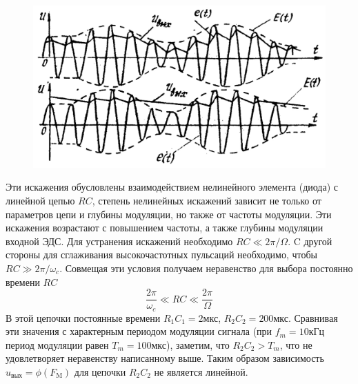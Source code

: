 \begin{figure}[H]
	\centering
	\includegraphics[width=0.8\linewidth]{picture/pic11.jpg}
	\caption{}
	\label{pic:11}
\end{figure}
Эти искажения обусловлены взаимодействием нелинейного элемента (диода) с линейной цепью $RC$, степень нелинейных искажений зависит не только от параметров цепи и глубины модуляции, но также от частоты модуляции. Эти искажения возрастают с повышением частоты, а также глубины модуляции входной ЭДС. Для устранения искажений необходимо $RC\ll2\pi/\Omega$. C другой стороны для сглаживания высокочастотных пульсаций необходимо, чтобы $RC\gg2\pi/\omega_c$. Совмещая эти условия получаем неравенство для выбора постоянно времени $RC$
$$\frac{2\pi}{\omega_c}\ll RC\ll\frac{2\pi}{\Omega}$$
В этой цепочки постоянные времени $R_1C_1=2\text{мкс}$, $R_2C_2=200\text{мкс}$. Сравнивая эти значения с характерным периодом модуляции сигнала (при $f_m=10\text{кГц}$ период модуляции равен $T_m=100\text{мкс}$), заметим, что $R_2C_2>T_m$, что не удовлетворяет неравенству написанному выше. Таким образом зависимость $u_{\text{вых}} = \phi(F_\text{M})$ для цепочки $R_2C_2$ не является линейной.

